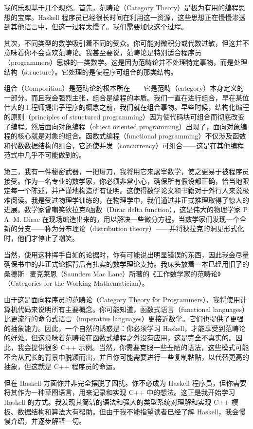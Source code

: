 我的乐观基于几个观察。首先，范畴论（Category Theory）是极为有用的编程思想的宝库。Haskell 程序员已经很长时间在利用这一资源，这些思想正在慢慢渗透到其他语言中，但这一过程太慢了。我们需要加快这个过程。

其次，不同类型的数学吸引着不同的受众。你可能对微积分或代数过敏，但这并不意味着你不会喜欢范畴论。我甚至要说，范畴论是特别适合程序员（programmers）思维的一类数学。这是因为范畴论并不处理特定事物，而是处理结构（structure）。它处理的是使程序可组合的那类结构。

组合（Composition）是范畴论的根本所在——它是范畴（category）本身定义的一部分。而且我会强烈主张，组合是编程的本质。我们一直在进行组合，早在某位伟大的工程师提出子程序的概念之前，我们就在组合事物。早些时候，结构化编程的原则（principles of structured programming）因为使代码块可组合而彻底改变了编程。然后面向对象编程（object oriented programming）出现了，面向对象编程的核心就是对象的组合。函数式编程（functional programming）不仅涉及函数和代数数据结构的组合，它还使并发（concurrency）可组合——这是在其他编程范式中几乎不可能做到的。

第三，我有一件秘密武器，一把屠刀，我将用它来屠宰数学，使之更易于被程序员接受。作为一名专业的数学家，你必须非常小心，确保所有假设都正确，恰当地限定每一个陈述，并严谨地构造所有证明。这使得数学论文和书籍对于外行人来说极难阅读。我是受过物理学训练的，在物理学中，我们通过非正式推理取得了惊人的进展。数学家曾嘲笑狄拉克δ函数（Dirac delta function），这是伟大的物理学家 P. A. M. Dirac 在现场编造出来的，用以解决一些微分方程。当数学家们发现一个全新的分支——称为分布理论（distribution theory）——并将狄拉克的洞见形式化时，他们才停止了嘲笑。

当然，使用这种挥手自如的论据时，你有可能说出明显错误的东西，因此我会尽量确保书中的非正式论据背后有扎实的数学理论支持。我床头放着一本已经用旧了的桑德斯·麦克莱恩（Saunders Mac Lane）所著的《工作数学家的范畴论》（Categories for the Working Mathematician）。

由于这是面向程序员的范畴论（Category Theory for Programmers），我将使用计算机代码来说明所有主要概念。你可能知道，函数式语言（functional languages）比更流行的命令式语言（imperative languages）更接近数学。它们也提供了更强的抽象能力。因此，一个自然的诱惑是：你必须学习 Haskell，才能享受到范畴论的好处。但这意味着范畴论在函数式编程之外没有应用，这是完全不真实的。因此，我会提供很多 C++ 示例。当然，你需要克服一些丑陋的语法，这些模式可能不会从冗长的背景中脱颖而出，并且你可能需要进行一些复制粘贴，以代替更高的抽象，但这就是 C++ 程序员的命运。

但在 Haskell 方面你并非完全摆脱了困扰。你不必成为 Haskell 程序员，但你需要将其作为一种草图语言，用来记录和实现 C++ 中的想法。这正是我开始学习 Haskell 的方式。我发现其简洁的语法和强大的类型系统对理解和实现 C++ 模板、数据结构和算法大有帮助。但由于我不能指望读者已经了解 Haskell，我会慢慢介绍，并逐步解释一切。

